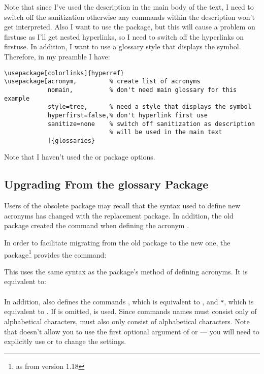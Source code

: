 \documentclass{nlctdoc}
\begin{document}
Note that since I've used the description in the main body of the
text, I need to switch off the sanitization otherwise any commands
within the description won't get interpreted. Also I want to use the
 package, but this will cause a problem on \gls{firstuse}
as I'll get nested hyperlinks, so I need to switch off the
hyperlinks on \gls{firstuse}. In addition, I want to use a glossary style
that displays the symbol. Therefore, in my preamble I have:

\begin{verbatim}
\usepackage[colorlinks]{hyperref}
\usepackage[acronym,         % create list of acronyms
            nomain,          % don't need main glossary for this example
            style=tree,      % need a style that displays the symbol
            hyperfirst=false,% don't hyperlink first use
            sanitize=none    % switch off sanitization as description 
                             % will be used in the main text
            ]{glossaries}
\end{verbatim}

Note that I haven't used the  or
 package options.

\subsection{Upgrading From the glossary Package}
\label{sec:oldacronym}
Users of the obsolete  package may recall that
the syntax used to define new acronyms has changed with the
replacement  package. In addition, the old
 package created the command 
\cs{} when defining the acronym .

In order to facilitate migrating from the old package to the new
one, the  package\footnote{as from version 1.18} 
provides the command:
\begin{definition}[\DescribeMacro{\oldacronym}]
\end{definition}
This uses the same syntax as the  package's
method of defining acronyms. It is equivalent to:\\[10pt]
\\[10pt]
In addition,  also defines the commands
\cs{}, which is equivalent to ,
and \cs{}\texttt{*}, which is equivalent to
. If  is omitted, 
is used. Since commands names must consist only of alphabetical
characters,  must also only consist of alphabetical
characters. Note that \cs{} doesn't allow you to use
the first optional argument of  or  --- you will
need to explicitly use  or  to change the
settings.
\end{document}
